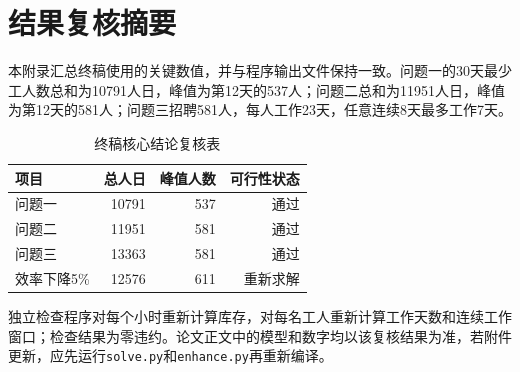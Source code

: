 \section{结果复核摘要}

本附录汇总终稿使用的关键数值，并与程序输出文件保持一致。问题一的30天最少工人数总和为10791人日，峰值为第12天的537人；问题二总和为11951人日，峰值为第12天的581人；问题三招聘581人，每人工作23天，任意连续8天最多工作7天。

\begin{table}[htbp]
\centering
\caption{终稿核心结论复核表}
\begin{tabular}{lrrr}
\toprule
项目 & 总人日 & 峰值人数 & 可行性状态\\
\midrule
问题一 & 10791 & 537 & 通过\\
问题二 & 11951 & 581 & 通过\\
问题三 & 13363 & 581 & 通过\\
效率下降5\% & 12576 & 611 & 重新求解\\
\bottomrule
\end{tabular}
\end{table}

独立检查程序对每个小时重新计算库存，对每名工人重新计算工作天数和连续工作窗口；检查结果为零违约。论文正文中的模型和数字均以该复核结果为准，若附件更新，应先运行\texttt{solve.py}和\texttt{enhance.py}再重新编译。
